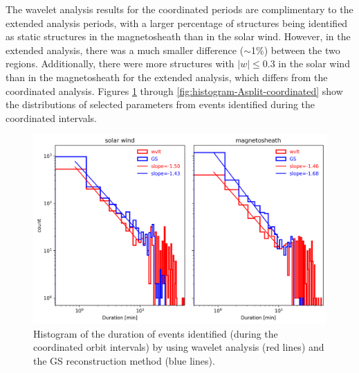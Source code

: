 The wavelet analysis results for the coordinated periods are complimentary to the extended analysis periods, with a larger percentage of structures being identified as static structures in the magnetosheath than in the solar wind. However, in the extended analysis, there was a much smaller difference ($\sim$1\%) between the two regions. Additionally, there were more structures with $|w|\leq 0.3$ in the solar wind than in the magnetosheath for the extended analysis, which differs from the coordinated analysis. Figures \ref{fig:histogram-duration-coordinated} through \ref{fig:histogram-Asplit-coordinated} show the distributions of selected parameters from events identified during the coordinated intervals.

\begin{figure}
    \centering
    \includegraphics[width=\textwidth]{Figures/Histograms/duration_coordinated.png}
    \caption[Histogram of duration from coordinated analysis]{Histogram of the duration of events identified (during the coordinated orbit intervals) by using wavelet analysis (red lines) and the GS reconstruction method (blue lines).}
    \label{fig:histogram-duration-coordinated}
\end{figure}

